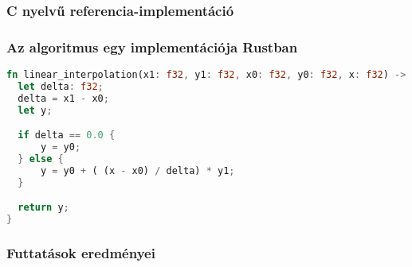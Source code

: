 \subsubsection{C nyelvű referencia-implementáció}
\begin{cppstyle}
\end{cppstyle}
\subsubsection{Az algoritmus egy implementációja Rustban}
\begin{lstlisting}[language=Rust]
fn linear_interpolation(x1: f32, y1: f32, x0: f32, y0: f32, x: f32) -> f32 {
  let delta: f32;
  delta = x1 - x0;
  let y;

  if delta == 0.0 {
      y = y0;
  } else {
      y = y0 + ( (x - x0) / delta) * y1;
  }

  return y;
}
\end{lstlisting}
\subsubsection{Futtatások eredményei}
